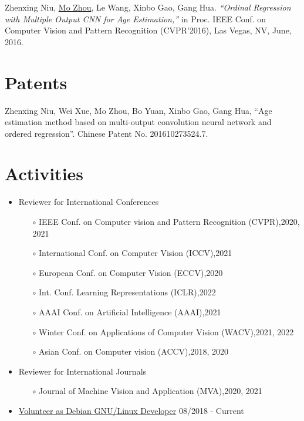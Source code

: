 \documentclass[margin,line,pifont,palatino,courier]{res}
\begin{document}
\begin{resume}
\begin{enumerate}[noitemsep, leftmargin=*, label={[C0{\arabic*}]}]
\item Zhenxing Niu, \underline{Mo Zhou}, Le Wang, Xinbo Gao, Gang Hua.
\textit{``Ordinal Regression with Multiple Output CNN for Age Estimation,''}
in Proc. IEEE Conf. on Computer Vision and Pattern Recognition (CVPR'2016),
Las Vegas, NV, June, 2016.

\end{enumerate}

\section{\sc Patents}

\begin{enumerate}[noitemsep, leftmargin=*, label={[P0{\arabic*}]}]

\item Zhenxing Niu, Wei Xue, Mo Zhou, Bo Yuan, Xinbo Gao, Gang Hua,
	``Age estimation method based on multi-output convolution neural
	network and ordered regression''. Chinese Patent No. 201610273524.7.

\end{enumerate}

\section{\sc Activities}

\begin{itemize}[noitemsep, leftmargin=*]
\item Reviewer for International Conferences
	\begin{itemize}[noitemsep, leftmargin=*]
		\item[$\circ$] IEEE Conf. on Computer vision and Pattern Recognition (CVPR),\hfill 2020, 2021
		\item[$\circ$] International Conf. on Computer Vision (ICCV),\hfill 2021
		\item[$\circ$] European Conf. on Computer Vision (ECCV),\hfill 2020
		\item[$\circ$] Int. Conf. Learning Representations (ICLR),\hfill 2022
		\item[$\circ$] AAAI Conf. on Artificial Intelligence (AAAI),\hfill 2021
		\item[$\circ$] Winter Conf. on Applications of Computer Vision (WACV),\hfill 2021, 2022
		\item[$\circ$] Asian Conf. on Computer vision (ACCV),\hfill 2018, 2020
	\end{itemize}
\item Reviewer for International Journals
	\begin{itemize}[noitemsep, leftmargin=*]
		\item[$\circ$] Journal of Machine Vision and Application (MVA),\hfill 2020, 2021
	\end{itemize}
\item \href{https://nm.debian.org/person/lumin/}{Volunteer as Debian GNU/Linux Developer}
	\hfill 08/2018 - Current\\
\end{itemize}


\end{resume}
\end{document}
